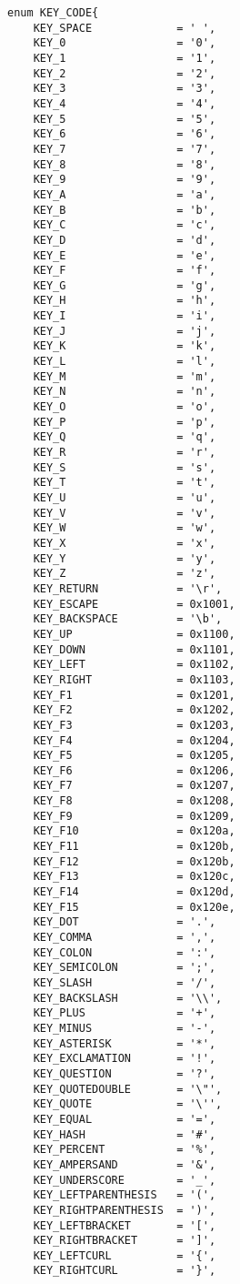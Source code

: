 \documentclass[document.tex]{subfiles}
\begin{document}
\begin{english}
\begin{lstlisting}[label=keyboard.h,caption=\en{Keybaord Driver Interface}]
enum KEY_CODE{
	KEY_SPACE             = ' ',
	KEY_0                 = '0',
	KEY_1                 = '1',
	KEY_2                 = '2',
	KEY_3                 = '3',
	KEY_4                 = '4',
	KEY_5                 = '5',
	KEY_6                 = '6',
	KEY_7                 = '7',
	KEY_8                 = '8',
	KEY_9                 = '9',
	KEY_A                 = 'a',
	KEY_B                 = 'b',
	KEY_C                 = 'c',
	KEY_D                 = 'd',
	KEY_E                 = 'e',
	KEY_F                 = 'f',
	KEY_G                 = 'g',
	KEY_H                 = 'h',
	KEY_I                 = 'i',
	KEY_J                 = 'j',
	KEY_K                 = 'k',
	KEY_L                 = 'l',
	KEY_M                 = 'm',
	KEY_N                 = 'n',
	KEY_O                 = 'o',
	KEY_P                 = 'p',
	KEY_Q                 = 'q',
	KEY_R                 = 'r',
	KEY_S                 = 's',
	KEY_T                 = 't',
	KEY_U                 = 'u',
	KEY_V                 = 'v',
	KEY_W                 = 'w',
	KEY_X                 = 'x',
	KEY_Y                 = 'y',
	KEY_Z                 = 'z',
	KEY_RETURN            = '\r',
	KEY_ESCAPE            = 0x1001,
	KEY_BACKSPACE         = '\b',
	KEY_UP                = 0x1100,
	KEY_DOWN              = 0x1101,
	KEY_LEFT              = 0x1102,
	KEY_RIGHT             = 0x1103,
	KEY_F1                = 0x1201,
	KEY_F2                = 0x1202,
	KEY_F3                = 0x1203,
	KEY_F4                = 0x1204,
	KEY_F5                = 0x1205,
	KEY_F6                = 0x1206,
	KEY_F7                = 0x1207,
	KEY_F8                = 0x1208,
	KEY_F9                = 0x1209,
	KEY_F10               = 0x120a,
	KEY_F11               = 0x120b,
	KEY_F12               = 0x120b,
	KEY_F13               = 0x120c,
	KEY_F14               = 0x120d,
	KEY_F15               = 0x120e,
	KEY_DOT               = '.',
	KEY_COMMA             = ',',
	KEY_COLON             = ':',
	KEY_SEMICOLON         = ';',
	KEY_SLASH             = '/',
	KEY_BACKSLASH         = '\\',
	KEY_PLUS              = '+',
	KEY_MINUS             = '-',
	KEY_ASTERISK          = '*',
	KEY_EXCLAMATION       = '!',
	KEY_QUESTION          = '?',
	KEY_QUOTEDOUBLE       = '\"',
	KEY_QUOTE             = '\'',
	KEY_EQUAL             = '=',
	KEY_HASH              = '#',
	KEY_PERCENT           = '%',
	KEY_AMPERSAND         = '&',
	KEY_UNDERSCORE        = '_',
	KEY_LEFTPARENTHESIS   = '(',
	KEY_RIGHTPARENTHESIS  = ')',
	KEY_LEFTBRACKET       = '[',
	KEY_RIGHTBRACKET      = ']',
	KEY_LEFTCURL          = '{',
	KEY_RIGHTCURL         = '}',

\end{lstlisting}
\end{english}
\end{document}
